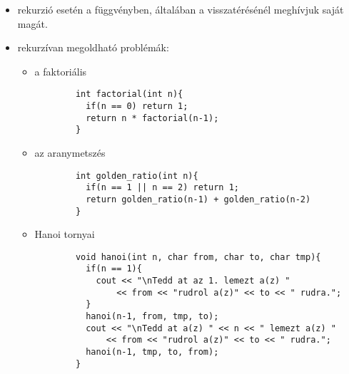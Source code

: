 \documentclass[main.tex]{subfiles}
\begin{document}
  \begin{itemize}
    \item rekurzió esetén a függvényben, általában
    a visszatérésénél meghívjuk saját magát.

    \item rekurzívan megoldható problémák:
    \begin{itemize}
      \item a faktoriális
      \begin{lstlisting}
        int factorial(int n){
          if(n == 0) return 1;
          return n * factorial(n-1);
        }
      \end{lstlisting}

      \item az aranymetszés
      \begin{lstlisting}
        int golden_ratio(int n){
          if(n == 1 || n == 2) return 1;
          return golden_ratio(n-1) + golden_ratio(n-2)
        }
      \end{lstlisting}

      \item Hanoi tornyai
      \begin{lstlisting}
        void hanoi(int n, char from, char to, char tmp){
          if(n == 1){
            cout << "\nTedd at az 1. lemezt a(z) "
                << from << "rudrol a(z)" << to << " rudra.";
          }
          hanoi(n-1, from, tmp, to);
          cout << "\nTedd at a(z) " << n << " lemezt a(z) "
              << from << "rudrol a(z)" << to << " rudra.";
          hanoi(n-1, tmp, to, from);
        }
      \end{lstlisting}
    \end{itemize}
  \end{itemize}
\end{document}
